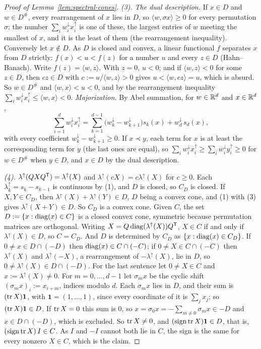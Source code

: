 \begin{proof}[Proof of Lemma~\ref{lem:spectral-cones}]
\emph{(3).} \emph{The dual description.} If $x \in D$ and $w \in D^\#$, every rearrangement of $x$ lies in
$D$, so $\langle w, \sigma x\rangle \ge 0$ for every permutation $\sigma$; the number
$\sum_iw^\downarrow_ix^\uparrow_i$ is one of these, the largest entries of $w$ meeting the smallest of $x$,
and it is the least of them (the rearrangement inequality). Conversely let $x \notin D$. As $D$ is closed
and convex, a linear functional $f$ separates $x$ from $D$ strictly: $f(x) < u < f(z)$ for a number $u$ and
every $z \in D$ (Hahn--Banach). Write $f(z) = \langle w, z\rangle$. With $z = 0$, $u < 0$; and if
$\langle w, z\rangle < 0$ for some $z \in D$, then $cz \in D$ with $c := u/\langle w, z\rangle > 0$ gives
$u < \langle w, cz\rangle = u$, which is absurd. So $w \in D^\#$ and $\langle w, x\rangle < u < 0$, and by
the rearrangement inequality $\sum_iw^\downarrow_ix^\uparrow_i \le \langle w, x\rangle < 0$.
\emph{Majorization.} By Abel summation, for $w \in \mathbb{R}^d$ and $x \in \mathbb{R}^d$,
\[
  \sum_{i=1}^dw^\downarrow_ix^\uparrow_i = \sum_{k=1}^{d-1}\bigl(w^\downarrow_k - w^\downarrow_{k+1}\bigr)s_k(x)
  + w^\downarrow_d\,s_d(x) ,
\]
with every coefficient $w^\downarrow_k - w^\downarrow_{k+1} \ge 0$. If $x \prec y$, each term for $x$ is at
least the corresponding term for $y$ (the last ones are equal), so
$\sum_iw^\downarrow_ix^\uparrow_i \ge \sum_iw^\downarrow_iy^\uparrow_i \ge 0$ for $w \in D^\#$ when
$y \in D$, and $x \in D$ by the dual description.

\emph{(4).} $\lambda^\uparrow(QXQ^{\mathsf{T}}) = \lambda^\uparrow(X)$ and $\lambda^\uparrow(cX) = c\lambda^\uparrow(X)$
for $c \ge 0$. Each $\lambda^\uparrow_k = s_k - s_{k-1}$ is continuous by (1), and $D$ is closed, so $C_D$
is closed. If $X, Y \in C_D$, then $\lambda^\uparrow(X) + \lambda^\uparrow(Y) \in D$, $D$ being a convex
cone, and (1) with (3) gives $\lambda^\uparrow(X+Y) \in D$. So $C_D$ is a convex cone. Given $C$, the set
$D := \{x : \operatorname{diag}(x) \in C\}$ is a closed convex cone, symmetric because permutation matrices are
orthogonal. Writing $X = Q\operatorname{diag}(\lambda^\uparrow(X))Q^{\mathsf{T}}$, $X \in C$ if and only if $\lambda^\uparrow(X)
\in D$, so $C = C_D$. And $D$ is determined by $C_D$ as $\{x : \operatorname{diag}(x) \in C_D\}$. If $0 \ne x \in D \cap
(-D)$ then $\operatorname{diag}(x) \in C \cap (-C)$; if $0 \ne X \in C \cap (-C)$ then $\lambda^\uparrow(X)$ and
$\lambda^\uparrow(-X)$, a rearrangement of $-\lambda^\uparrow(X)$, lie in $D$, so $0 \ne \lambda^\uparrow(X)
\in D \cap (-D)$. For the last sentence let $0 \ne X \in C$ and $x := \lambda^\uparrow(X) \ne 0$. For
$m = 0, \dots, d-1$ let $\sigma_mx$ be the cyclic shift $(\sigma_mx)_i := x_{i+m}$, indices modulo $d$.
Each $\sigma_mx$ lies in $D$, and their sum is $(\operatorname{tr} X)\mathbf 1$, with $\mathbf 1 = (1, \dots, 1)$, since
every coordinate of it is $\sum_jx_j$; so $(\operatorname{tr} X)\mathbf 1 \in D$. If $\operatorname{tr} X = 0$ this sum is $0$, so
$x = \sigma_0x = -\sum_{m\ne0}\sigma_mx \in -D$ and $x \in D \cap (-D)$, which is excluded. So $\operatorname{tr} X \ne 0$,
and $(\operatorname{sign}\operatorname{tr} X)\mathbf 1 \in D$, that is, $(\operatorname{sign}\operatorname{tr} X)\,I \in C$. As $I$ and
$-I$ cannot both lie in $C$, the sign is the same for every nonzero $X \in C$, which is the claim.


\end{proof}
